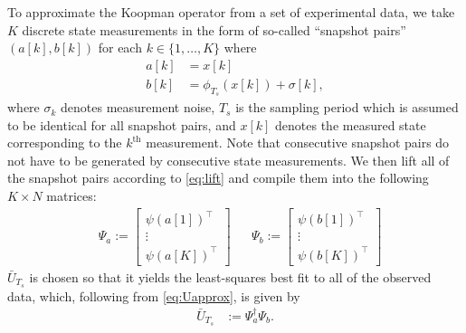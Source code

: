 To approximate the Koopman operator from a set of experimental data, we take $K$ discrete state measurements in the form of so-called ``snapshot pairs'' $(a[k] , b[k])$ for each $k \in \{1,\ldots,K\}$ where
\begin{align}
    a[k] &= x[k] \\
    b[k] &= \phi_{T_s} (x[k]) + \sigma[k],
    \label{eq:ab}
\end{align}
where $\sigma_k$ denotes measurement noise, $T_s$ is the sampling period which is assumed to be identical for all snapshot pairs, and $x[k]$ denotes the measured state corresponding to the $k^\text{th}$ measurement.
Note that consecutive snapshot pairs do not have to be generated by consecutive state measurements. 
We then lift all of the snapshot pairs according to \eqref{eq:lift} and compile them into the following ${K \times N}$ matrices:
\begin{align}
    &\Psi_a := \begin{bmatrix} {\psi}(a[1])^\top \\ \vdots \\  {\psi}(a[K])^\top \end{bmatrix}
    &&\Psi_b := \begin{bmatrix} {\psi}(b[1])^\top \\ \vdots \\  {\psi}(b[K])^\top \end{bmatrix}
    \label{eq:Psi}
\end{align}
$\bar{U}_{T_s}$ is chosen so that it yields the least-squares best fit to all of the observed data, which, following from \eqref{eq:Uapprox}, is given by 
\begin{align}
    \bar{U}_{T_s} &:= \Psi_a^\dagger \Psi_b.
\end{align}

